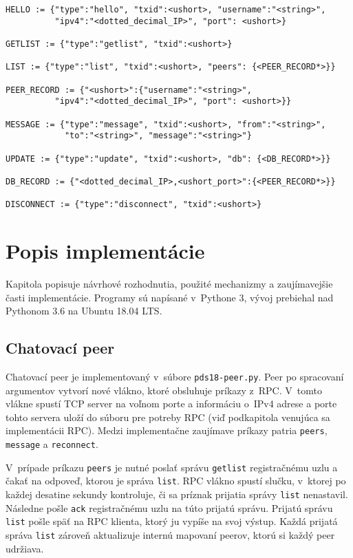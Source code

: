 \begin{verbatim}
HELLO := {"type":"hello", "txid":<ushort>, "username":"<string>", 
		  "ipv4":"<dotted_decimal_IP>", "port": <ushort>}   
		                      	
GETLIST := {"type":"getlist", "txid":<ushort>}     
                  	
LIST := {"type":"list", "txid":<ushort>, "peers": {<PEER_RECORD*>}}   
                    
PEER_RECORD := {"<ushort>":{"username":"<string>", 
		  "ipv4":"<dotted_decimal_IP>", "port": <ushort>}}     
		                    
MESSAGE := {"type":"message", "txid":<ushort>, "from":"<string>",
			"to":"<string>", "message":"<string>"}
			                      
UPDATE := {"type":"update", "txid":<ushort>, "db": {<DB_RECORD*>}}
                       
DB_RECORD := {"<dotted_decimal_IP>,<ushort_port>":{<PEER_RECORD*>}}
                       
DISCONNECT := {"type":"disconnect", "txid":<ushort>}
\end{verbatim}

\chapter{Popis implementácie}

Kapitola popisuje návrhové rozhodnutia, použité mechanizmy a zaujímavejšie časti implementácie. Programy sú napísané v~Pythone 3, vývoj prebiehal nad Pythonom 3.6 na Ubuntu 18.04 LTS.

\section{Chatovací peer}

Chatovací peer je implementovaný v~súbore \texttt{pds18-peer.py}. Peer po spracovaní argumentov vytvorí nové vlákno, ktoré obsluhuje príkazy z~RPC. V~tomto vlákne spustí TCP server na voľnom porte a informáciu o~IPv4 adrese a porte tohto servera uloží do súboru pre potreby RPC (viď podkapitola venujúca sa implementácii RPC). Medzi implementačne zaujímave príkazy patria \texttt{peers}, \texttt{message} a \texttt{reconnect}. 

V~prípade príkazu \texttt{peers} je nutné poslať správu \texttt{getlist} registračnému uzlu a čakať na odpoveď, ktorou je správa \texttt{list}. RPC vlákno spustí slučku, v~ktorej po každej desatine sekundy kontroluje, či sa príznak prijatia správy \texttt{list} nenastavil. Následne pošle \texttt{ack} registračnému uzlu na túto prijatú správu. Prijatú správu \texttt{list} pošle späť na RPC klienta, ktorý ju vypíše na svoj výstup. Každá prijatá správa \texttt{list} zároveň aktualizuje internú  mapovaní peerov, ktorú si každý peer udržiava. 

